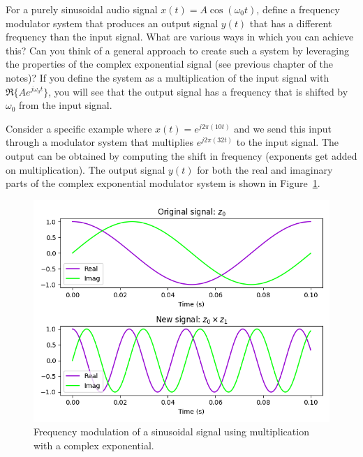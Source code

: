 \documentclass{ee102_notes}
\begin{document}
\begin{popquiz}
For a purely sinusoidal audio signal $x(t) = A\cos(\omega_0 t)$, define a frequency modulator system that produces an output signal $y(t)$ that has a different frequency than the input signal. What are various ways in which you can achieve this? Can you think of a general approach to create such a system by leveraging the properties of the complex exponential signal (see previous chapter of the notes)?
\popqsplit
If you define the system as a multiplication of the input signal with $\Re\{A e^{j\omega_0 t}\}$, you will see that the output signal has a frequency that is shifted by $\omega_0$ from the input signal. 
\end{popquiz}
Consider a specific example where $x(t) = e^{j 2 \pi (10 t)}$ and we send this input through a modulator system that multiplies $e^{j 2 \pi (32 t)}$ to the input signal. The output can be obtained by computing the shift in frequency (exponents get added on multiplication). The output signal $y(t)$ for both the real and imaginary parts of the complex exponential modulator system is shown in Figure~\ref{fig:fm_sine}. 
\begin{figure}[ht]
    \centering
    \includegraphics[width=\textwidth]{figs/fm_sine.png} 
    \caption{Frequency modulation of a sinusoidal signal using multiplication with a complex exponential.}
    \label{fig:fm_sine}
\end{figure}
\end{document}
